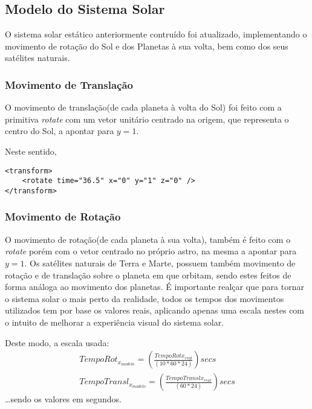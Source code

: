 \documentclass[relatorio.tex]{subfiles}
\begin{document}
    
\subsection{Modelo do Sistema Solar} \label{subsec:sistema_solar}

O sistema solar estático anteriormente contruído 
foi atualizado, implementando o movimento de rotação do Sol 
e dos Planetas à sua volta, bem como dos seus satélites naturais. 

\subsubsection{Movimento de Translação}
O movimento de translação(de cada planeta à volta do Sol) foi feito com a primitiva 
\textit{rotate} com um vetor unitário centrado na origem, que representa o centro do Sol, a apontar para $y=1$.

Neste sentido,
\begin{code}
\label{code:translate_terra}
\begin{verbatim}
<transform>
    <rotate time="36.5" x="0" y="1" z="0" />
</transform>
\end{verbatim}
\end{code}

\subsubsection{Movimento de Rotação}
O movimento de rotação(de cada planeta à sua volta), também é feito com o \textit{rotate} 
porém com o vetor centrado no próprio astro, na mesma a apontar para $y=1$. Os satélites naturais de 
Terra e Marte, possuem também movimento de rotação e de translação sobre o planeta em que orbitam, 
sendo estes feitos de forma análoga ao movimento dos planetas. 
É importante realçar que para tornar o sistema solar o mais perto da realidade, todos os tempos
dos movimentos utilizados tem por base os valores reais, aplicando apenas uma escala nestes com 
o intuito de melhorar a experiência visual do sistema solar.

Deste modo, a escala usada:
\begin{eqnarray} 
    TempoRot_{x_{modelo}} = (\frac{TempoRot{x_{real}}}{(10*60*24)}) secs \\
    TempoTransl_{x_{modelo}} = (\frac{TempoTransl{x_{real}}}{(60*24)}) secs 
\end{eqnarray}
\dots sendo os valores em segundos.
\end{document}
